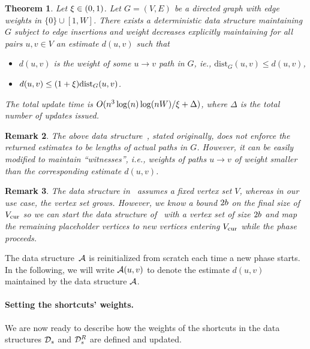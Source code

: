 \documentclass[11pt,letterpaper]{article}
\theoremstyle{plain}
\newtheorem{theorem}{Theorem}[section]
\newtheorem{remark}[theorem]{Remark}
\renewcommand{\O}{O}
\newcommand{\dist}{\mathrm{dist}}
\begin{document}
\begin{theorem}\label{t:dense-apsp}{}
  Let $\xi\in (0,1)$. Let $G=(V,E)$ be a directed graph with edge weights in $\{0\}\cup [1,W]$.
There exists a deterministic data structure maintaining $G$ subject to edge insertions
and weight decreases explicitly maintaining for all pairs $u,v\in V$ an estimate $d(u,v)$ such that
\begin{itemize}
  \item $d(u,v)$ is the weight of some $u\to v$ path in $G$, ie., $\dist_G(u,v)\leq d(u,v)$,
  \item $d(u,v) \leq (1+\epsp)\dist_G(u,v)$.
\end{itemize}
The total update time is $\O(n^3\log(n)\log(nW)/\epsp+\Delta)$,
where $\Delta$ is the total number of updates issued.
\end{theorem}
\begin{remark}
The above data structure~{}, stated originally, does not enforce the returned estimates to be lengths of actual paths in $G$.
However, it can be easily modified to maintain ``witnesses'', i.e., weights of paths $u\to v$ of weight smaller than the corresponding estimate $d(u,v)$.
\end{remark}
\begin{remark}
The data structure in~ assumes a fixed vertex set $V$, whereas in our use case, the vertex set grows. However, we know a bound $2b$ on the final size of $V_{\mathrm{cur}}$ so we can start the data structure of~ with a vertex set of size $2b$ and map the remaining placeholder vertices to new vertices entering $V_{\mathrm{cur}}$ while the phase proceeds.
\end{remark}
The data structure~$\mathcal{A}$ is reinitialized from scratch each time a new phase starts.
In the following, we will write $\mathcal{A}(u,v)$ to denote the estimate $d(u,v)$ maintained by the data structure $\mathcal{A}$.

\paragraph{Setting the shortcuts' weights.}
We are now ready to describe how the weights of the shortcuts in the data structures $\mathcal{D}_s$ and
$\mathcal{D}^{R}_s$ are defined and updated.
\end{document}

